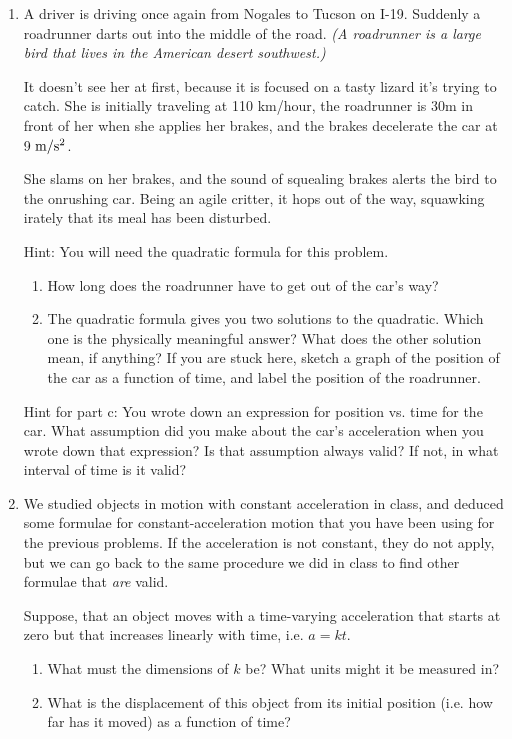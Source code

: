 \documentclass[12pt]{article}
\begin{document}
\begin{enumerate}
\bigskip
\bigskip

\item A driver is driving once again from Nogales to Tucson on I-19. Suddenly a roadrunner darts out into the middle of the road. {\it (A roadrunner is a large bird that lives in the American desert 
    southwest.)}

    It doesn't see her at first, because it is focused on a tasty lizard it's trying to catch. She is initially traveling at 110 km/hour, 
the roadrunner is 30m in front of her when she applies her brakes, and the brakes decelerate the car at 9 $\rm m/\rm s^2$.

She slams on her brakes, and the sound of squealing brakes alerts the bird to the onrushing car. Being an agile critter, it hops out of the way, squawking irately that its meal has been disturbed.

    Hint: You will need the quadratic formula for this problem.
\begin{enumerate}

\item    How long does the roadrunner have to get out of the car's way? 
\item    The quadratic formula gives you two solutions to the quadratic. Which one is the physically meaningful answer? What does the other solution mean, if anything? If you are stuck here, sketch a graph of the position of the car as a function of time, and label the position of the roadrunner.
\end{enumerate}

Hint for part c: You wrote down an expression for position vs. time for the car. What assumption did you make
about the car's acceleration when you wrote down that expression? Is that assumption always valid? If not,
in what interval of time is it valid?

\bigskip
\bigskip

\item We studied objects in motion with constant acceleration in class, and deduced some formulae for 
constant-acceleration motion that you have been using for the previous problems. If the acceleration is not
constant, they do not apply, but we can go back to the same procedure we did in class to find other formulae that
{\it are} valid.

 Suppose, that an object moves with a time-varying acceleration that starts at zero but that increases linearly with time, i.e. $a = kt$. 

\begin{enumerate}
\item What must the dimensions of $k$ be? What units might it be measured in?
\item What is the displacement of this object from its initial position (i.e. how far has it moved) as a function of time?
\end{enumerate}


\end{enumerate}
\end{document}
